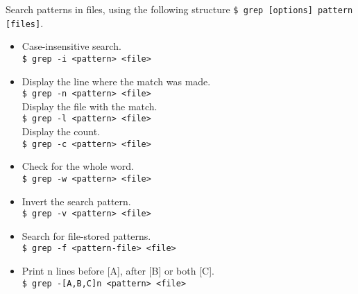 Search patterns in files, using the following structure {\tt \$ grep [options] pattern [files]}.
\begin{itemize}[label={-}, leftmargin=*]
    \item Case-insensitive search.\\
    {\tt \$ grep -i <pattern> <file>}
    
    \item Display the line where the match was made.\\
    {\tt \$ grep -n <pattern> <file>}\\
    Display the file with the match.\\
    {\tt \$ grep -l <pattern> <file>}\\
    Display the count.\\
    {\tt \$ grep -c <pattern> <file>}\\
    
    \item Check for the whole word.\\
    {\tt \$ grep -w <pattern> <file>}
    
    \item Invert the search pattern.\\
    {\tt \$ grep -v <pattern> <file>}
    
    \item Search for file-stored patterns.\\
    {\tt \$ grep -f <pattern-file> <file>}
    
    \item Print n lines before [A], after [B] or both [C].\\
    {\tt \$ grep -[A,B,C]n <pattern> <file>}
\end{itemize}    
